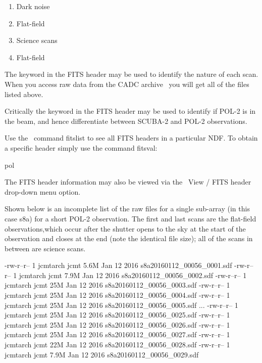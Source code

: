 \begin{enumerate}\itemsep-0.2em
\item Dark noise
\item Flat-field
\item Science scans
\item Flat-field
\end{enumerate}


The  keyword in the FITS header may be used to identify the nature of each scan.
When you access raw data from the CADC archive \
 you will get all of the files listed above.


Critically the  keyword in the FITS header may be used to
identify if POL-2 is in the beam, and hence differentiate between SCUBA-2
and POL-2 observations.


\begin{tip}
Use the  \Kappa\ command fitslist to see all FITS headers in a particular
NDF. To obtain a specific header simply use the command fitsval:
\begin{terminalv}
pol
\end{terminalv}
The FITS header information may also be viewed via the \gaia\ View / FITS header 
drop-down menu option.

\end{tip}

Shown below is an incomplete list of the raw files for a single sub-array (in this
case s8a) for a short POL-2 observation. The first and last
scans are the flat-field observations,which occur after the shutter
opens to the sky at the start of the observation and closes at the end
(note the identical file size); all of the scans in between are
science scans.


\begin{terminalv}
\end{terminalv}

\begin{terminalv}
-rw-r--r-- 1 jcmtarch jcmt 5.6M Jan 12  2016 s8a20160112_00056_0001.sdf
-rw-r--r-- 1 jcmtarch jcmt 7.9M Jan 12  2016 s8a20160112_00056_0002.sdf
-rw-r--r-- 1 jcmtarch jcmt  25M Jan 12  2016 s8a20160112_00056_0003.sdf
-rw-r--r-- 1 jcmtarch jcmt  25M Jan 12  2016 s8a20160112_00056_0004.sdf
-rw-r--r-- 1 jcmtarch jcmt  25M Jan 12  2016 s8a20160112_00056_0005.sdf
...
-rw-r--r-- 1 jcmtarch jcmt  25M Jan 12  2016 s8a20160112_00056_0025.sdf
-rw-r--r-- 1 jcmtarch jcmt  25M Jan 12  2016 s8a20160112_00056_0026.sdf
-rw-r--r-- 1 jcmtarch jcmt  25M Jan 12  2016 s8a20160112_00056_0027.sdf
-rw-r--r-- 1 jcmtarch jcmt  22M Jan 12  2016 s8a20160112_00056_0028.sdf
-rw-r--r-- 1 jcmtarch jcmt 7.9M Jan 12  2016 s8a20160112_00056_0029.sdf
\end{terminalv}

